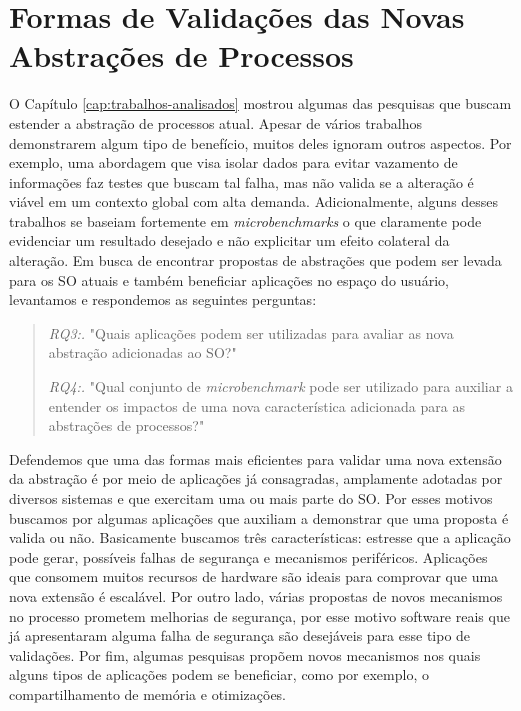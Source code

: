 \chapter{Formas de Validações das Novas Abstrações de Processos}
\label{cap:validacoes}

O Capítulo \ref{cap:trabalhos-analisados} mostrou algumas das pesquisas que
buscam estender a abstração de processos atual. Apesar de vários trabalhos
demonstrarem algum tipo de benefício, muitos deles ignoram outros aspectos. Por
exemplo, uma abordagem que visa isolar dados para evitar vazamento de
informações faz testes que buscam tal falha, mas não valida se a alteração é
viável em um contexto global com alta demanda.  Adicionalmente, alguns desses
trabalhos se baseiam fortemente em \textit{microbenchmarks} o que claramente
pode evidenciar um resultado desejado e não explicitar um efeito colateral da
alteração. Em busca de encontrar propostas de abstrações que podem ser levada
para os SO atuais e também beneficiar aplicações no espaço do usuário,
levantamos e respondemos as seguintes perguntas:

\begin{quote}
 \item \textit{RQ3:.} "Quais aplicações podem ser utilizadas para avaliar as nova abstração adicionadas ao SO?"
 \item \textit{RQ4:.} "Qual conjunto de \emph{microbenchmark} pode ser utilizado para auxiliar a entender os impactos de uma nova característica adicionada para as abstrações de processos?"
\end{quote}

Defendemos que uma das formas mais eficientes para validar uma nova extensão da
abstração é por meio de aplicações já consagradas, amplamente adotadas por
diversos sistemas e que exercitam uma ou mais parte do SO. Por esses motivos
buscamos por algumas aplicações que auxiliam a demonstrar que uma proposta é
valida ou não. Basicamente buscamos três características: estresse que a
aplicação pode gerar, possíveis falhas de segurança e mecanismos periféricos.
Aplicações que consomem muitos recursos de hardware são ideais para comprovar
que uma nova extensão é escalável. Por outro lado, várias propostas de novos
mecanismos no processo prometem melhorias de segurança, por esse motivo
software reais que já apresentaram alguma falha de segurança são desejáveis
para esse tipo de validações. Por fim, algumas pesquisas propõem novos
mecanismos nos quais alguns tipos de aplicações podem se beneficiar, como por
exemplo, o compartilhamento de memória e otimizações.

